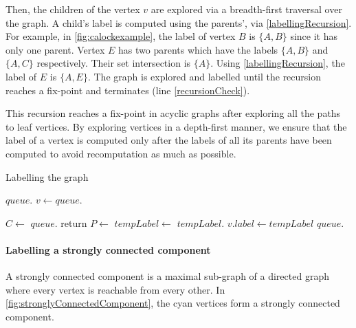 Then, the children of the vertex $v$ are explored via a breadth-first traversal over the graph. A child's label is computed using the parents', via \cref{labellingRecursion}. For example, in \cref{fig:calockexample}, the label of vertex $B$ is $\{A, B\}$ since it has only one parent. Vertex $E$ has two parents which have the labels $\{A, B\}$ and $\{A, C\}$ respectively. Their set intersection is $\{A\}$. Using \cref{labellingRecursion}, the label of $E$ is $\{A, E\}$. The graph is explored and labelled until the recursion reaches a fix-point and terminates (line \ref{recursionCheck}). 

This recursion reaches a fix-point in acyclic graphs after exploring all the paths to leaf vertices. By exploring vertices in a depth-first manner, we ensure that the label of a vertex is computed only after the labels of all its parents have been computed to avoid recomputation as much as possible.


\begin{algorithm}[h]
	\caption{Labelling the graph}
	\begin{algorithmic}[1]
		\State $queue$.
		\State $v\gets queue.$
		\State {}
		\EndWhile
		\EndProcedure
		\Statex

		\State $C\gets$
		 \label{rootLabellingBegin}
		\State $queue.$
		\State return
		\EndIf\label{rootLabellingEnd}
		\State $P\gets$\label{labellingRelationImplBegin}
		\State $tempLabel\gets$\label{intersectionStart}
		\State $tempLabel$. \label{intersectionEnd}
		 \label{recursionCheck}
		\State $v.label\gets tempLabel$
		\State $queue.$
		\EndIf \label{labellingRelationImplEnd}
		\EndProcedure
	\end{algorithmic}
	\label{labelAssignment}
\end{algorithm}


\paragraph{Labelling a strongly connected component}
A strongly connected component is a maximal sub-graph of a directed graph where every vertex is reachable from every other. 
In \cref{fig:stronglyConnectedComponent}, the cyan vertices form a strongly connected component.


